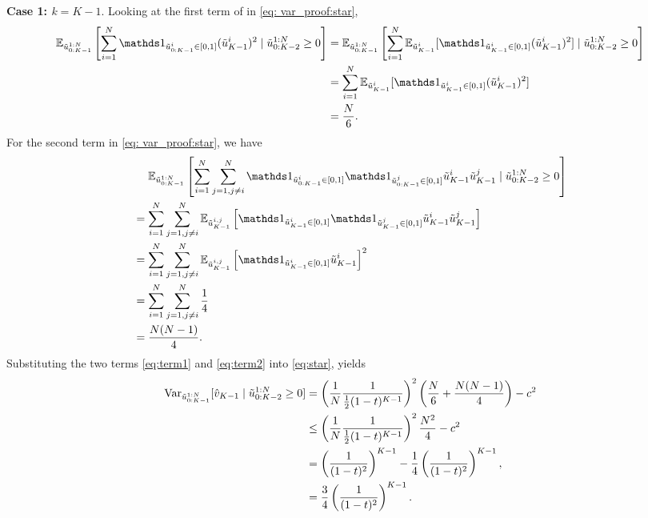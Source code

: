 \noindent\textbf{Case 1: $k = K-1$}.
Looking at the first term of \circled{$\star$} in \eqref{eq: var_proof:star},
\begin{align}
    \E_{\tilde{u}_{0:K-1}^{1:N}}\left[
        \sum_{i=1}^N \ind{\tilde{u}^i_{0:K-1} \in [0, 1]} (\tilde{u}^i_{K-1})^2
        \mid \tilde{u}_{0:K-2}^{1:N} \geq 0
    \right]
    &= \E_{\tilde{u}_{0:K-1}^{1:N}}\left[
        \sum_{i=1}^N \E_{\tilde{u}^i_{K-1}}[ \ind{\tilde{u}^i_{K-1} \in [0, 1]}  (\tilde{u}^i_{K-1})^2 ]
        \mid \tilde{u}_{0:K-2}^{1:N} \geq 0
    \right] \\
    &= \sum_{i=1}^N \E_{\tilde{u}^i_{K-1}}[ \ind{\tilde{u}^i_{K-1} \in [0, 1]}  (\tilde{u}^i_{K-1})^2 ] \\
    &= \frac{N}{6}.\label{eq:term1}
\end{align}
For the second term in \eqref{eq: var_proof:star}, we have
\begin{align}
    &\mathrel{\phantom{=}} \E_{\tilde{u}_{0:K-1}^{1:N}}\left[
        \sum_{i=1}^N \sum_{j=1, j\not=i}^N \ind{\tilde{u}^i_{0:K-1} \in [0, 1]} \ind{\tilde{u}^j_{0:K-1} \in [0, 1]} \tilde{u}^i_{K-1} \tilde{u}^j_{K-1}
        \mid \tilde{u}_{0:K-2}^{1:N} \geq 0
    \right] \\
    &= \sum_{i=1}^N \sum_{j=1, j\not=i}^N \E_{\tilde{u}_{K-1}^{i,j}}\left[ \ind{\tilde{u}^i_{K-1} \in [0, 1]} \ind{\tilde{u}^j_{K-1} \in [0, 1]} \tilde{u}^i_{K-1} \tilde{u}^j_{K-1} \right] \\
    &= \sum_{i=1}^N \sum_{j=1, j\not=i}^N \E_{\tilde{u}_{K-1}^{i,j}}\left[ \ind{\tilde{u}^i_{K-1} \in [0, 1]} \tilde{u}^i_{K-1} \right]^2 \\
    &= \sum_{i=1}^N \sum_{j=1, j\not=i}^N \frac{1}{4} \\
    &= \frac{N(N-1)}{4}.\label{eq:term2}
\end{align}
Substituting the two terms \eqref{eq:term1} and \eqref{eq:term2} into \eqref{eq:star}, yields
\begin{align}
    \operatorname{Var}_{\tilde{u}_{0:K-1}^{1:N}}[ \hat{v}_{K-1} \mid \tilde{u}_{0:K-2}^{1:N} \geq 0 ]
    &= \left( \frac{1}{N} \frac{1}{ \frac{1}{2} (1-t)^{K-1} } \right)^2
    \left( \frac{N}{6} + \frac{N(N-1)}{4} \right) - c^2 \\
    &\leq \left( \frac{1}{N} \frac{1}{ \frac{1}{2} (1-t)^{K-1} } \right)^2
    \frac{N^2}{4} - c^2 \\
    &= \left( \frac{1}{ (1-t)^2} \right)^{K-1} - \frac{1}{4} \left( \frac{1}{ (1-t)^2} \right)^{K-1}, \\
    &= \frac{3}{4} \left( \frac{1}{ (1-t)^2} \right)^{K-1}.
\end{align}

